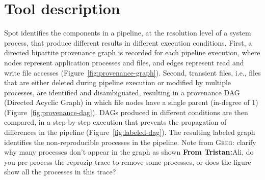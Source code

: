 \documentclass[a4paper,num-refs]{oup-contemporary}
\newcommand{\note}[2]{\color{blue}Note from \textsc{#1}: #2\color{black}}
\newcommand{\tristan}[1]{\color{orange}\textbf{From Tristan:}#1\color{black}}
\newcommand{\toolname}[0]{Spot\xspace}
\begin{document}



\section{Tool description}

\toolname identifies the components in a pipeline, at the resolution level of a system process, that produce different
results in different execution conditions. First, a directed
bipartite provenance graph is recorded for each pipeline execution, where nodes
represent application processes and files, and edges represent read and
write file accesses (Figure~\ref{fig:provenance-graph}). Second,
transient files, i.e., files that are either deleted during pipeline
execution or modified by multiple processes, are identified and
disambiguated, resulting in a provenance DAG (Directed Acyclic
Graph) in which file nodes have a single parent (in-degree of 1) (Figure~\ref{fig:provenance-dag}). 
DAGs produced in different conditions are then compared, in
a step-by-step execution that prevents the propagation of differences in the pipeline (Figure~\ref{fig:labeled-dag}).
 The resulting labeled graph identifies the
non-reproducible processes in the pipeline. \note{Greg}{clarify why many processes don't appear in the graph as shown} \tristan{Ali, 
do you pre-process the reprozip trace to remove some processes, or does the figure show all the processes in this trace?}
\end{document}
